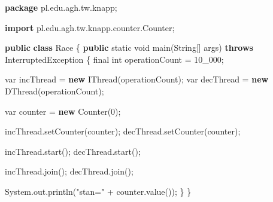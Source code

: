 \documentclass[11pt]{article}
\newenvironment{Shaded}{}{}
\newcommand{\KeywordTok}[1]{\textcolor[rgb]{0.00,0.44,0.13}{\textbf{{#1}}}}
\newcommand{\DataTypeTok}[1]{\textcolor[rgb]{0.56,0.13,0.00}{{#1}}}
\newcommand{\DecValTok}[1]{\textcolor[rgb]{0.25,0.63,0.44}{{#1}}}
\newcommand{\StringTok}[1]{\textcolor[rgb]{0.25,0.44,0.63}{{#1}}}
\newcommand{\FunctionTok}[1]{\textcolor[rgb]{0.02,0.16,0.49}{{#1}}}
\newcommand{\NormalTok}[1]{{#1}}
\newcommand{\ImportTok}[1]{{#1}}
\newcommand{\OperatorTok}[1]{\textcolor[rgb]{0.40,0.40,0.40}{{#1}}}
\newcommand{\BuiltInTok}[1]{{#1}}
\begin{document}
\begin{Shaded}
\begin{Highlighting}[]
\KeywordTok{package}\ImportTok{ pl}\OperatorTok{.}\ImportTok{edu}\OperatorTok{.}\ImportTok{agh}\OperatorTok{.}\ImportTok{tw}\OperatorTok{.}\ImportTok{knapp}\OperatorTok{;}

\KeywordTok{import} \ImportTok{pl}\OperatorTok{.}\ImportTok{edu}\OperatorTok{.}\ImportTok{agh}\OperatorTok{.}\ImportTok{tw}\OperatorTok{.}\ImportTok{knapp}\OperatorTok{.}\ImportTok{counter}\OperatorTok{.}\ImportTok{Counter}\OperatorTok{;}

\KeywordTok{public} \KeywordTok{class}\NormalTok{ Race }\OperatorTok{\{}
    \KeywordTok{public} \DataTypeTok{static} \DataTypeTok{void} \FunctionTok{main}\OperatorTok{(}\BuiltInTok{String}\OperatorTok{[]}\NormalTok{ args}\OperatorTok{)} \KeywordTok{throws} \BuiltInTok{InterruptedException} \OperatorTok{\{}
        \DataTypeTok{final} \DataTypeTok{int}\NormalTok{ operationCount }\OperatorTok{=} \DecValTok{10\_000}\OperatorTok{;}

        \DataTypeTok{var}\NormalTok{ incThread }\OperatorTok{=} \KeywordTok{new} \FunctionTok{IThread}\OperatorTok{(}\NormalTok{operationCount}\OperatorTok{);}
        \DataTypeTok{var}\NormalTok{ decThread }\OperatorTok{=} \KeywordTok{new} \FunctionTok{DThread}\OperatorTok{(}\NormalTok{operationCount}\OperatorTok{);}

        \DataTypeTok{var}\NormalTok{ counter }\OperatorTok{=} \KeywordTok{new} \FunctionTok{Counter}\OperatorTok{(}\DecValTok{0}\OperatorTok{);}

\NormalTok{        incThread}\OperatorTok{.}\FunctionTok{setCounter}\OperatorTok{(}\NormalTok{counter}\OperatorTok{);}
\NormalTok{        decThread}\OperatorTok{.}\FunctionTok{setCounter}\OperatorTok{(}\NormalTok{counter}\OperatorTok{);}

\NormalTok{        incThread}\OperatorTok{.}\FunctionTok{start}\OperatorTok{();}
\NormalTok{        decThread}\OperatorTok{.}\FunctionTok{start}\OperatorTok{();}

\NormalTok{        incThread}\OperatorTok{.}\FunctionTok{join}\OperatorTok{();}
\NormalTok{        decThread}\OperatorTok{.}\FunctionTok{join}\OperatorTok{();}

        \BuiltInTok{System}\OperatorTok{.}\FunctionTok{out}\OperatorTok{.}\FunctionTok{println}\OperatorTok{(}\StringTok{"stan="} \OperatorTok{+}\NormalTok{ counter}\OperatorTok{.}\FunctionTok{value}\OperatorTok{());}
    \OperatorTok{\}}
\OperatorTok{\}}
\end{Highlighting}
\end{Shaded}
\end{document}
